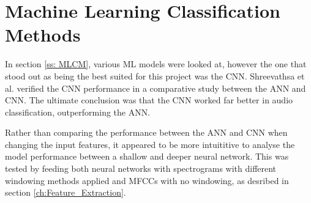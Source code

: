 % 
% 
% 
\section{Machine Learning Classification Methods \label{ch:ML_Methods}}
\vspace{0.5cm}




In section \ref{ss: MLCM}, various ML models were looked at, however the one that stood out as being the best suited for this project was the CNN. Shreevathsa et al. verified the CNN performance in a comparative study between the ANN and CNN. The ultimate conclusion was that the CNN worked far better in audio classification, outperforming the ANN. 

Rather than comparing the performance between the ANN and CNN when changing the input features, it appeared to be more intuititive to analyse the model performance between a shallow and deeper neural network. This was tested by feeding both neural networks with spectrograms with different windowing methods applied and MFCCs with no windowing, as desribed in section \ref{ch:Feature_Extraction}. 


% 
% 
